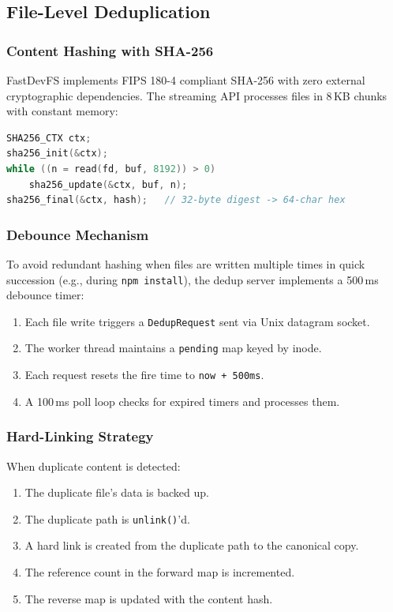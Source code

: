 \documentclass[12pt, a4paper]{article}
\begin{document}
\subsection{File-Level Deduplication}

\subsubsection{Content Hashing with SHA-256}

FastDevFS implements FIPS 180-4 compliant SHA-256 with zero external cryptographic dependencies. The streaming API processes files in 8\,KB chunks with constant memory:

\begin{lstlisting}[language=C++]
SHA256_CTX ctx;
sha256_init(&ctx);
while ((n = read(fd, buf, 8192)) > 0)
    sha256_update(&ctx, buf, n);
sha256_final(&ctx, hash);   // 32-byte digest -> 64-char hex
\end{lstlisting}

\subsubsection{Debounce Mechanism}

To avoid redundant hashing when files are written multiple times in quick succession (e.g., during \texttt{npm install}), the dedup server implements a 500\,ms debounce timer:

\begin{enumerate}
  \item Each file write triggers a \texttt{DedupRequest} sent via Unix datagram socket.
  \item The worker thread maintains a \texttt{pending} map keyed by inode.
  \item Each request resets the fire time to \texttt{now + 500ms}.
  \item A 100\,ms poll loop checks for expired timers and processes them.
\end{enumerate}

\subsubsection{Hard-Linking Strategy}

When duplicate content is detected:
\begin{enumerate}
  \item The duplicate file's data is backed up.
  \item The duplicate path is \texttt{unlink()}'d.
  \item A hard link is created from the duplicate path to the canonical copy.
  \item The reference count in the forward map is incremented.
  \item The reverse map is updated with the content hash.
\end{enumerate}
\end{document}
